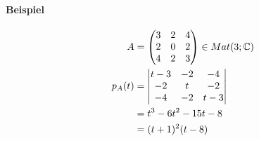 \paragraph{Beispiel}
\begin{align}
A &= \begin{pmatrix} 3 & 2 & 4 \\ 2 & 0 & 2 \\ 4 & 2 & 3 \end{pmatrix} \in Mat(3; \mathbb{C}) \\
p_A(t) &= \begin{vmatrix} t-3 & -2 & -4 \\ -2 & t & -2 \\ -4 & -2 & t-3 \end{vmatrix} \\
&= t^3 - 6t^2 - 15t - 8 \\
&= (t+1)^2 (t-8)
\end{align}
